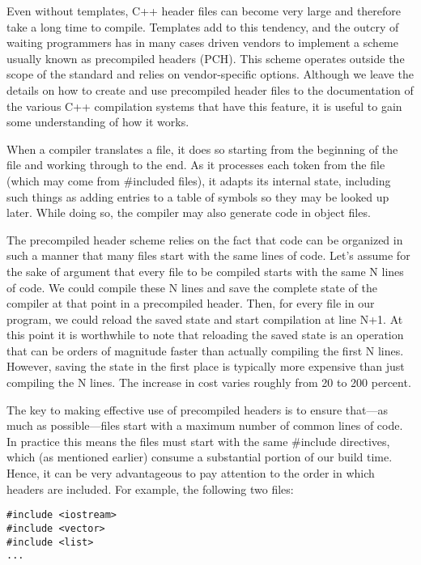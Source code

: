 
Even without templates, C++ header files can become very large and therefore take a long time to compile. Templates add to this tendency, and the outcry of waiting programmers has in many cases driven vendors to implement a scheme usually known as precompiled headers (PCH). This scheme operates outside the scope of the standard and relies on vendor-specific options. Although we leave the details on how to create and use precompiled header files to the documentation of the various C++ compilation systems that have this feature, it is useful to gain some understanding of how it works. 

When a compiler translates a file, it does so starting from the beginning of the file and working through to the end. As it processes each token from the file (which may come from \#included files), it adapts its internal state, including such things as adding entries to a table of symbols so they may be looked up later. While doing so, the compiler may also generate code in object files.

The precompiled header scheme relies on the fact that code can be organized in such a manner that many files start with the same lines of code. Let’s assume for the sake of argument that every file to be compiled starts with the same N lines of code. We could compile these N lines and save the complete state of the compiler at that point in a precompiled header. Then, for every file in our program, we could reload the saved state and start compilation at line N+1. At this point it is worthwhile to note that reloading the saved state is an operation that can be orders of magnitude faster than actually compiling the first N lines. However, saving the state in the first place is typically more expensive than just compiling the N lines. The increase in cost varies roughly from 20 to 200 percent. 

The key to making effective use of precompiled headers is to ensure that—as much as possible—files start with a maximum number of common lines of code. In practice this means the files must start with the same \#include directives, which (as mentioned earlier) consume a substantial portion of our build time. Hence, it can be very advantageous to pay attention to the order in which headers are included. For example, the following two files:

\begin{lstlisting}[style=styleCXX]
#include <iostream>
#include <vector>
#include <list>
...
\end{lstlisting}

